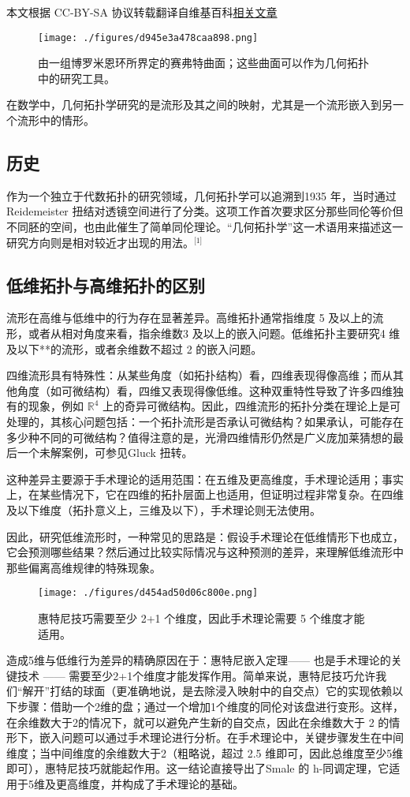 
本文根据 CC-BY-SA 协议转载翻译自维基百科\href{https://en.wikipedia.org/wiki/Geometric_topology}{相关文章}

\begin{figure}[ht]
\centering
\texttt{[image: ./figures/d945e3a478caa898.png]}
\caption{由一组博罗米恩环所界定的赛弗特曲面；这些曲面可以作为几何拓扑中的研究工具。} \label{fig_JHtpx_1}
\end{figure}
在数学中，几何拓扑学研究的是流形及其之间的映射，尤其是一个流形嵌入到另一个流形中的情形。
\subsection{历史}
作为一个独立于代数拓扑的研究领域，几何拓扑学可以追溯到1935 年，当时通过Reidemeister 扭结对透镜空间进行了分类。这项工作首次要求区分那些同伦等价但不同胚的空间，也由此催生了简单同伦理论。“几何拓扑学”这一术语用来描述这一研究方向则是相对较近才出现的用法。\(^\text{[1]}\)
\subsection{低维拓扑与高维拓扑的区别}
流形在高维与低维中的行为存在显著差异。高维拓扑通常指维度 5 及以上的流形，或者从相对角度来看，指余维数3 及以上的嵌入问题。低维拓扑主要研究4 维及以下**的流形，或者余维数不超过 2 的嵌入问题。


四维流形具有特殊性：从某些角度（如拓扑结构）看，四维表现得像高维；而从其他角度（如可微结构）看，四维又表现得像低维。这种双重特性导致了许多四维独有的现象，例如 $\mathbb{R}^4$ 上的奇异可微结构。因此，四维流形的拓扑分类在理论上是可处理的，其核心问题包括：一个拓扑流形是否承认可微结构？如果承认，可能存在多少种不同的可微结构？值得注意的是，光滑四维情形仍然是广义庞加莱猜想的最后一个未解案例，可参见Gluck 扭转。

这种差异主要源于手术理论的适用范围：在五维及更高维度，手术理论适用；事实上，在某些情况下，它在四维的拓扑层面上也适用，但证明过程非常复杂。在四维及以下维度（拓扑意义上，三维及以下），手术理论则无法使用。

因此，研究低维流形时，一种常见的思路是：假设手术理论在低维情形下也成立，它会预测哪些结果？然后通过比较实际情况与这种预测的差异，来理解低维流形中那些偏离高维规律的特殊现象。
\begin{figure}[ht]
\centering
\texttt{[image: ./figures/d454ad50d06c800e.png]}
\caption{惠特尼技巧需要至少 2+1 个维度，因此手术理论需要 5 个维度才能适用。} \label{fig_JHtpx_2}
\end{figure}
造成5维与低维行为差异的精确原因在于：惠特尼嵌入定理—— 也是手术理论的关键技术 —— 需要至少2+1个维度才能发挥作用。简单来说，惠特尼技巧允许我们“解开”打结的球面（更准确地说，是去除浸入映射中的自交点）它的实现依赖以下步骤：借助一个2维的盘；通过一个增加1个维度的同伦对该盘进行变形。这样，在余维数大于2的情况下，就可以避免产生新的自交点，因此在余维数大于 2 的情形下，嵌入问题可以通过手术理论进行分析。在手术理论中，关键步骤发生在中间维度；当中间维度的余维数大于2（粗略说，超过 2.5 维即可，因此总维度至少5维即可），惠特尼技巧就能起作用。这一结论直接导出了Smale 的 h-同调定理，它适用于5维及更高维度，并构成了手术理论的基础。

